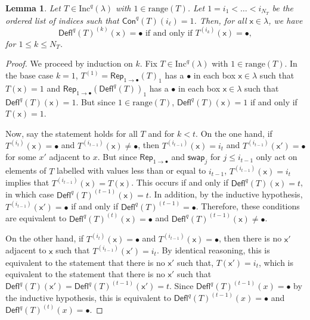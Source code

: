 \documentclass[12pt]{amsart}
\newcommand{\x}{\ensuremath{\mathsf{x}}}
\newtheorem{lemma}[theorem]{Lemma}
\theoremstyle{definition}
\theoremstyle{remark}
\numberwithin{equation}{section}
\newcommand{\inc}{\ensuremath{\mathrm{Inc}}}
\newcommand{\swap}{\ensuremath{\mathsf{swap}}}
\newcommand{\rep}{\ensuremath{\mathsf{Rep}}}
\newcommand{\deflate}{\ensuremath{\mathsf{Defl}}}
\newcommand{\content}{\ensuremath{\mathsf{Con}}}
\begin{document}
\begin{lemma} \label{lem:bullet_placement}
Let $T \in \inc^q(\lambda)$ with $1 \in \mathrm{range}(T)$. Let $1 = i_1 < \dots < i_{N_T}$ be the ordered list of indices such that $\content^q(T)(i_\ell) = 1$. Then, for all $\x \in \lambda$, we have
 \begin{equation}\label{eq:gappy_promotion2}
\deflate^q(T)^{(k)}(\x) = \bullet \text{ if and only if } T^{(i_k)}(\x) = \bullet,
\end{equation}
for $1 \leq k \leq N_T$.
\end{lemma}
\begin{proof} We proceed by induction on $k$. Fix $T \in \inc^q(\lambda)$  with $1 \in \mathrm{range}(T)$. In the base case $k = 1$,  $T^{(1)} = \rep_{1 \rightarrow \bullet}(T)_{1}$ has a $\bullet$ in each box $\x \in \lambda$ such that $T(\x) = 1$ and $\rep_{1 \rightarrow \bullet}(\deflate^q(T))_{1}$ has a $\bullet$ in each box $\x \in \lambda$ such that $\deflate^q(T)(\x) = 1$. But since $1 \in \mathrm{range}(T)$, $\deflate^q(T)(\x) = 1$ if and only if $T(\x) = 1$. 


Now, say the statement holds for all $T$ and for $k < t$. On the one hand, if $T^{(i_t)}(\x) = \bullet$ and $T^{(i_{t-1})}(\x) \neq \bullet$, then $T^{(i_{t-1})}(\x) = i_t$ and $T^{(i_{t-1})}(\x') = \bullet$ for some $x'$ adjacent to $x$. But since $\rep_{1 \rightarrow \bullet}$ and $\swap_j$ for  $j \leq i_{t-1}$ only act on elements of $T$ labelled with values less than or equal to $i_{t-1}$, $T^{(i_{t-1})}(\x) = i_t$ implies that $T^{(i_{t-1})}(\x) = T(\x)$. This occurs if and only if $\deflate^q(T)(\x) = t$, in which case $\deflate^q(T)^{(t-1)}(\x) = t$. In addition, by the inductive hypothesis, $T^{(i_{t-1})}(\x') = \bullet$ if and only if $\deflate^q(T)^{(t-1)} = \bullet$. Therefore, these conditions are equivalent to $\deflate^q(T)^{(t)}(\x) = \bullet$ and $\deflate^q(T)^{(t-1)}(\x) \neq \bullet$. 

On the other hand, if $T^{(i_t)}(\x) = \bullet$ and $T^{(i_{t-1})}(\x) = \bullet$, then there is no $\x'$ adjacent to $\x$ such that $T^{(i_{t-1})}(\x') = i_t$. By identical reasoning, this is equivalent to the statement that there is no $\x'$ such that, $T(\x') = i_t$, which is equivalent to the statement that there is no $\x'$ such that $\deflate^q(T)(\x') = \deflate^q(T)^{(t-1)}(\x') = t$. Since $\deflate^q(T)^{(t-1)}(x) = \bullet$ by the inductive hypothesis, this is equivalent to $\deflate^q(T)^{(t-1)}(x) = \bullet$ and $\deflate^q(T)^{(t)}(x) = \bullet$.
\end{proof}
\end{document}
